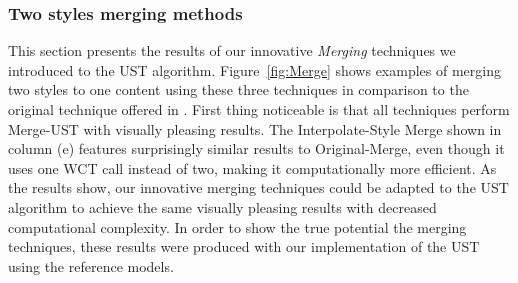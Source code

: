 \subsubsection{Two styles merging methods}
This section presents the results of our innovative \textit{Merging} techniques we introduced to the UST algorithm. Figure~\ref{fig:Merge} shows examples of merging two styles to one content using these three techniques in comparison to the original technique offered in \cite{bib11}. First thing noticeable is that all techniques perform Merge-UST with visually pleasing results. The Interpolate-Style Merge shown in column (e) features surprisingly similar results to Original-Merge, even though it uses one WCT call instead of two, making it computationally more efficient. As the results show, our innovative merging techniques could be adapted to the UST algorithm to achieve the same visually pleasing results with decreased computational complexity. In order to show the true potential the merging techniques, these results were produced with our implementation of the UST using the reference models.

